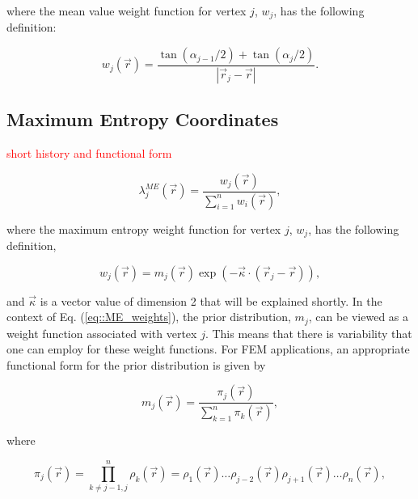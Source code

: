 \documentclass[preprint,10pt]{elsarticle}
\newcommand{\tcr}[1]{\textcolor{red}{#1}}
\begin{document}
\noindent where the mean value weight function for vertex $j$, $w_j$, has the following definition:

\begin{equation}
\label{eq::MV_weights}
w_j (\vec{r})  = \frac{\tan(\alpha_{j-1} / 2) + \tan(\alpha_j / 2)}{|\vec{r}_j - \vec{r}|}.
\end{equation}

\subsection{Maximum Entropy Coordinates}

\tcr{short history and functional form}

\begin{equation}
\label{eq::ME_BF}
\lambda_{j}^{ME} (\vec{r}) = \frac{w_j (\vec{r}) }{\sum\limits_{i=1}^{n} w_i (\vec{r})} ,
\end{equation}

\noindent where the maximum entropy weight function for vertex $j$, $w_j$, has the following definition,

\begin{equation}
\label{eq::ME_weights}
w_j (\vec{r})  = m_j(\vec{r}) \exp(-  \vec{\kappa} \cdot (\vec{r}_j - \vec{r})),
\end{equation}

\noindent and $\vec{\kappa}$ is a vector value of dimension 2 that will be explained shortly. In the context of Eq. (\ref{eq::ME_weights}), the prior distribution, $m_j$, can be viewed as a weight function associated with vertex $j$. This means that there is variability that one can employ for these weight functions. For FEM applications, an appropriate functional form for the prior distribution is given by

\begin{equation}
\label{eq::ME_prior_funcs}
 m_j(\vec{r}) = \frac{\pi_j (\vec{r}) }{\sum\limits_{k=1}^{n} \pi_k (\vec{r})},
\end{equation}

\noindent where

\begin{equation}
\label{eq::ME_prior_products}
\pi_j (\vec{r}) = \prod\limits_{k \neq j-1, j}^{n} \rho_k (\vec{r})  = \rho_1(\vec{r}) \ldots \rho_{j-2}(\vec{r}) \rho_{j+1}(\vec{r}) \ldots \rho_{n}(\vec{r}) ,
\end{equation}
\end{document}
